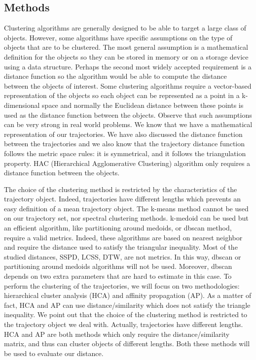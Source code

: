 \documentclass[a4paper, 12pt]{article}
\begin{document}
\subsection{Methods}
Clustering algorithms are generally designed to be able to target a large class of objects. However, some algorithms have specific assumptions on the type of objects that are to be clustered. The most general assumption is a mathematical definition for the objects so they can be stored in memory or on a storage device using a data structure. Perhaps the second most widely accepted requirement is a distance function so the algorithm would be able to compute the distance between the objects of interest. Some clustering algorithms require a vector-based representation of the objects so each object can be represented as a point in a k-dimensional space and normally the Euclidean distance between these points is used as the distance function between the objects. Observe that such assumptions can be very strong in real world problems. We know that we have a mathematical representation of our trajectories. We have also discussed the distance function between the trajectories and we also know that the trajectory distance function follows the metric space rules: it is symmetrical, and it follows the triangulation property. HAC (Hierarchical Agglomerative Clustering) algorithm only requires a distance function between the objects.

The choice of the clustering method is restricted by the characteristics of the trajectory object. Indeed, trajectories have different lengths which prevents an easy definition of a mean trajectory object. The k-means method cannot be used on our trajectory set, nor spectral clustering methods. k-medoid can be used but an efficient algorithm, like partitioning around medoids, or dbscan method, require a valid metrics. Indeed, these algorithms are based on nearest neighbor and require the distance used to satisfy the triangular inequality. Most of the studied distances, SSPD, LCSS, DTW, are not metrics. In this way, dbscan or partitioning around medoids algorithms will not be used. Moreover, dbscan depends on two extra parameters that are hard to estimate in this case. To perform the clustering of the trajectories, we will focus on two methodologies: hierarchical cluster analysis (HCA) and affinity propagation (AP). As a matter of fact, HCA and AP can use distance/similarity which does not satisfy the triangle inequality. We point out that the choice of the clustering method is restricted to the trajectory object we deal with. Actually, trajectories have different lengths. HCA and AP are both methods which only require the distance/similarity matrix, and thus can cluster objects of different lengths. Both these methods will be used to evaluate our distance.
\end{document}
